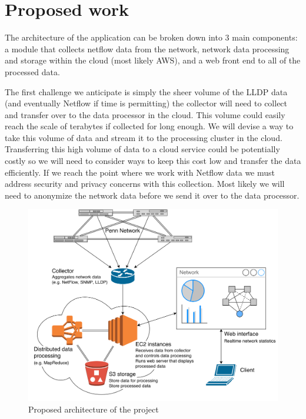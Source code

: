 \documentclass{sig-alternate}
\begin{document}
\section{Proposed work}

The architecture of the application can be broken down into 3 main components: a
module that collects netflow data from the network, network data processing and
storage within the cloud (most likely AWS), and a web front end to all of the
processed data.

The first challenge we anticipate is simply the sheer volume of the LLDP data
(and eventually Netflow if time is permitting) the collector will need to
collect and transfer over to the data processor in the cloud. This volume could
easily reach the scale of terabytes if collected for long enough. We will devise
a way to take this volume of data and stream it to the processing cluster in the
cloud. Transferring this high volume of data to a cloud service could be
potentially costly so we will need to consider ways to keep this cost low and
transfer the data efficiently. If we reach the point where we work with Netflow
data we must address security and privacy concerns with this collection. Most
likely we will need to anonymize the network data before we send it over to the
data processor.

\begin{figure}[htb!]
    \centering
    \includegraphics[width=\linewidth]{mockup}
    \caption{Proposed architecture of the project}
    \label{fig:mockup}
\end{figure}
\end{document}
